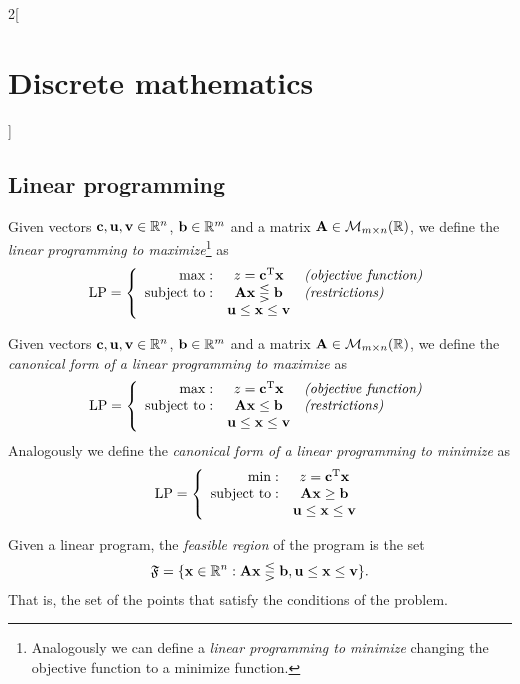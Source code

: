 \documentclass[../../../main.tex]{subfiles}
\begin{document}
\begin{multicols}{2}[\section{Discrete mathematics}]
\subsection{Linear programming}
\begin{definition}
Given vectors $\vb{c},\vb{u},\vb{v}\in\mathbb{R} ^n$, $\vb{b}\in\mathbb{R} ^m$ and a matrix $\vb{A}\in\mathcal{M}_{m\times n}(\mathbb{R} )$, we define the \textit{linear programming to maximize}\footnote{Analogously we can define a \textit{linear programming to minimize} changing the objective function to a minimize function.} as $$\text{LP}=\left\{\begin{array}{rcl}
    \max: & z=\vb{c}^{\mathrm{T}}\vb{x} & \textit{(objective function)} \\
    \text{subject to}: & \vb{A}\vb{x}\lesseqgtr \vb{b} & \textit{(restrictions)}\\
     & \vb{u}\leq \vb{x}\leq \vb{v} & 
    \end{array}\right.$$
\end{definition}
\begin{definition}
Given vectors $\vb{c},\vb{u},\vb{v}\in\mathbb{R} ^n$, $\vb{b}\in\mathbb{R} ^m$ and a matrix $\vb{A}\in\mathcal{M}_{m\times n}(\mathbb{R} )$, we define the \textit{canonical form of a linear programming to maximize} as $$\text{LP}=\left\{\begin{array}{rcl}
    \max: & z=\vb{c}^{\mathrm{T}}\vb{x} & \textit{(objective function)} \\
    \text{subject to}: & \vb{A}\vb{x}\leq \vb{b} & \textit{(restrictions)}\\
     & \vb{u}\leq \vb{x}\leq \vb{v} & 
    \end{array}\right.$$
Analogously we define the \textit{canonical form of a linear programming to minimize} as $$\text{LP}=\left\{\begin{array}{rc}
    \min: & z=\vb{c}^{\mathrm{T}}\vb{x} \\
    \text{subject to}: & \vb{A}\vb{x}\geq \vb{b}\\
     & \vb{u}\leq \vb{x}\leq \vb{v}
    \end{array}\right.$$
\end{definition}
\begin{definition}
Given a linear program, the \textit{feasible region} of the program is the set $$\mathfrak{F}=\{\vb{x}\in\mathbb{R} ^n:\vb{A}\vb{x}\lesseqgtr \vb{b},\vb{u}\leq \vb{x}\leq \vb{v}\}.$$ That is, the set of the points that satisfy the conditions of the problem.

\end{definition}
\end{multicols}
\end{document}
